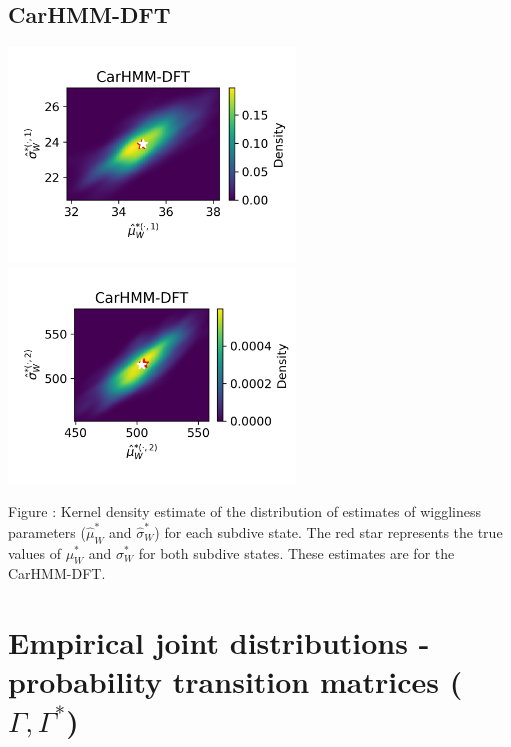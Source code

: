 \documentclass{article}
\begin{document}
        \subsection{CarHMM-DFT}
        \begin{center}
        \includegraphics[width=3in]{../Plots/hmm_FV_MLE_density_FoVeDBA_0_0.png}
        \includegraphics[width=3in]{../Plots/hmm_FV_MLE_density_FoVeDBA_0_1.png}
        \end{center}
        
        \noindent Figure : Kernel density estimate of the distribution of estimates of wiggliness parameters ($\hat \mu^*_W$ and $\hat \sigma^*_W$) for each subdive state. The red star represents the true values of $\mu^*_W$ and $\sigma^*_W$ for both subdive states. These estimates are for the CarHMM-DFT.
        \addtocounter{fignum}{1}
        
    \newpage
    \section{Empirical joint distributions - probability transition matrices ($\Gamma, \Gamma^*$)}
        
\end{document}
